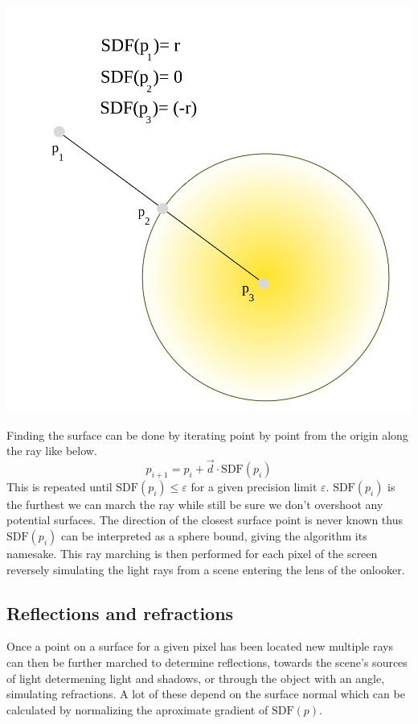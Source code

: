 \hfill
\begin{minipage}{0.3\textwidth}
	\includegraphics[width=\linewidth]{figure/SDF} 
\end{minipage}

\bigskip

Finding the surface can be done by iterating point by point from the origin
along the ray like below. $$p_{i+1} = p_i + \vec{d}\cdot \text{SDF}(p_i)$$ This
is repeated until $\text{SDF}(p_i) \leq \varepsilon$ for a given precision
limit $\varepsilon$. $\text{SDF}(p_i)$ is the furthest we can march the ray
while still be sure we don't overshoot any potential surfaces.  The direction
of the closest surface point is never known thus $\text{SDF}(p_i)$ can be
interpreted as a sphere bound, giving the algorithm its namesake. This ray
marching is then performed for each pixel of the screen reversely simulating
the light rays from a scene entering the lens of the onlooker.
	
	\subsection{Reflections and refractions}

	Once a point on a surface for a given pixel has been located new multiple
	rays can then be further marched to determine reflections, towards the
	scene's sources of light determening light and shadows, or through the object
	with an angle, simulating refractions. A lot of these depend on the surface
	normal which can be calculated by normalizing the aproximate gradient of
	$\text{SDF}(p)$. 


